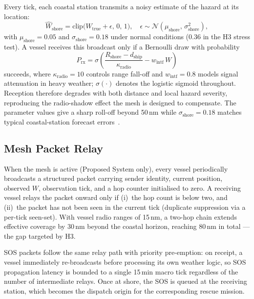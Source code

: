 \documentclass[cameraready]{Interspeech}
\begin{document}
Every tick, each coastal station transmits a noisy estimate of the hazard at its location:
%
\begin{equation}
  \hat{W}_\text{shore} = \text{clip}\bigl(W_\text{true} + \epsilon,\,0,\,1\bigr),
  \quad \epsilon \sim \mathcal{N}(\mu_\text{shore},\,\sigma_\text{shore}^2),
  \label{eq:shoreNoise}
\end{equation}
%
with $\mu_\text{shore} = 0.05$ and $\sigma_\text{shore} = 0.18$ under normal conditions ($0.36$ in the H3 stress test). A vessel receives this broadcast only if a Bernoulli draw with probability
%
\begin{equation}
  P_\text{rx} = \sigma\left(
    \frac{R_\text{shore} - d_\text{ship}}{\kappa_\text{radio}}
    - w_\text{intf}\,W
  \right)
  \label{eq:Prx}
\end{equation}
%
succeeds, where $\kappa_\text{radio} = 10$ controls range fall-off and $w_\text{intf} = 0.8$ models signal attenuation in heavy weather; $\sigma(\cdot)$ denotes the logistic sigmoid throughout. Reception therefore degrades with both distance and local hazard severity, reproducing the radio-shadow effect the mesh is designed to compensate. The parameter values give a sharp roll-off beyond 50\,nm while $\sigma_\text{shore} = 0.18$ matches typical coastal-station forecast errors~\cite{silveira2013}.

\subsection{Mesh Packet Relay}

When the mesh is active (Proposed System only), every vessel periodically broadcasts a structured packet carrying sender identity, current position, observed $W$, observation tick, and a hop counter initialised to zero. A receiving vessel relays the packet onward only if (i)~the hop count is below two, and (ii)~the packet has not been seen in the current tick (duplicate suppression via a per-tick seen-set). With vessel radio ranges of 15\,nm, a two-hop chain extends effective coverage by 30\,nm beyond the coastal horizon, reaching 80\,nm in total — the gap targeted by H3.

SOS packets follow the same relay path with priority pre-emption: on receipt, a vessel immediately re-broadcasts before processing its own weather logic, so SOS propagation latency is bounded to a single 15\,min macro tick regardless of the number of intermediate relays. Once at shore, the SOS is queued at the receiving station, which becomes the dispatch origin for the corresponding rescue mission.
\end{document}
